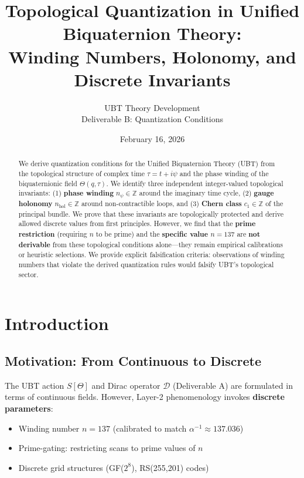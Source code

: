 \documentclass[12pt]{article}
\title{Topological Quantization in Unified Biquaternion Theory:\\
       Winding Numbers, Holonomy, and Discrete Invariants}
\author{UBT Theory Development\\
        \small Deliverable B: Quantization Conditions}
\date{February 16, 2026}
\newcommand{\Z}{\mathbb{Z}}
\begin{document}
\maketitle

\begin{abstract}
We derive quantization conditions for the Unified Biquaternion Theory (UBT) from the topological structure of complex time $\tau = t + i\psi$ and the phase winding of the biquaternionic field $\Theta(q,\tau)$. We identify three independent integer-valued topological invariants: (1) \textbf{phase winding} $n_\psi \in \Z$ around the imaginary time cycle, (2) \textbf{gauge holonomy} $n_{\text{hol}} \in \Z$ around non-contractible loops, and (3) \textbf{Chern class} $c_1 \in \Z$ of the principal bundle. We prove that these invariants are topologically protected and derive allowed discrete values from first principles. However, we find that the \textbf{prime restriction} (requiring $n$ to be prime) and the \textbf{specific value $n=137$} are \textbf{not derivable} from these topological conditions alone—they remain empirical calibrations or heuristic selections. We provide explicit falsification criteria: observations of winding numbers that violate the derived quantization rules would falsify UBT's topological sector.
\end{abstract}

\tableofcontents
\newpage

\section{Introduction}

\subsection{Motivation: From Continuous to Discrete}

The UBT action $S[\Theta]$ and Dirac operator $\mathcal{D}$ (Deliverable A) are formulated in terms of continuous fields. However, Layer-2 phenomenology invokes \textbf{discrete parameters}:
\begin{itemize}
    \item Winding number $n = 137$ (calibrated to match $\alpha^{-1} \approx 137.036$)
    \item Prime-gating: restricting scans to prime values of $n$
    \item Discrete grid structures (GF($2^8$), RS(255,201) codes)
\end{itemize}
\end{document}
